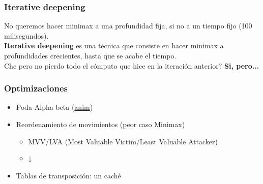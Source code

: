\begin{frame}
\frametitle{Iterative deepening}
No queremos hacer minimax a una profundidad fija, si no a un tiempo fijo (100 milisegundos). \\
\vspace{1em}
\pause
\textbf{Iterative deepening} es una técnica que consiste en hacer minimax a profundidades crecientes, hasta que se acabe el tiempo. \\
\vspace{1em}
\pause
Che pero no pierdo todo el cómputo que hice en la iteración anterior? \pause \textbf{Si, pero...} \\
\end{frame}

\begin{frame}
\frametitle{Optimizaciones}
\begin{itemize}
\item<1-> Poda Alpha-beta (\href{https://mlomb.dev/slides/mcts}{anim})
\item<2-> Reordenamiento de movimientos (peor caso Minimax)
\begin{itemize}
\item MVV/LVA (Most Valuable Victim/Least Valuable Attacker)
\item ↓
\end{itemize}
\item<3-> Tablas de transposición: un caché
\end{itemize}
\end{frame}

